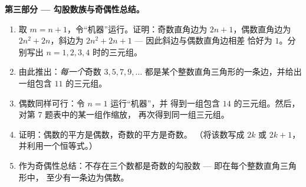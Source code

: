 \begin{problem}[{周末问题 --- 整数直角三角形，
以及恒等式 $(m^2 - n^2)^2 + (2mn)^2 = (m^2 + n^2)^2$，
它能生成全部此类三角形}]
\medskip
\noindent\textbf{第三部分 --- 勾股数族与奇偶性总结。}
\begin{enumerate}[resume]
  \item 取 $m = n + 1$，令“机器”运行。证明：奇数直角边为
        $2n + 1$，偶数直角边为 $2n^2 + 2n$，斜边为
        $2n^2 + 2n + 1$ --- 因此斜边与偶数直角边相差
        恰好为 $1$。分别写出 $n = 1, 2, 3, 4$ 时的三元组。
  \item 由此推出：\emph{每一个}奇数 $3, 5, 7, 9, \dots$
        都是某个整数直角三角形的一条边，并给出
        一组包含 $11$ 的三元组。
  \item 偶数同样可行：令 $n = 1$ 运行“机器”，并
        得到一组包含 $14$ 的三元组。然后，
        对第 7 题表中的某一组作缩放，
        再次得到同一组三元组。
  \item 证明：偶数的平方是偶数，奇数的平方是奇数。
        （将该数写成 $2k$ 或 $2k + 1$，
        并利用一个恒等式。）
  \item 作为奇偶性总结：不存在三个数都是奇数的勾股数 ---
        即在每个整数直角三角形中，
        至少有一条边为偶数。
\end{enumerate}
\end{problem}
